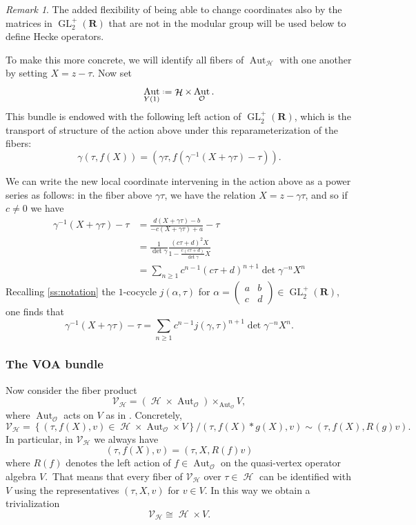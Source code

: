 \documentclass[12pt]{amsart}
\theoremstyle{plain}
\theoremstyle{definition}
\theoremstyle{remark}
\newtheorem{rmk}[thm]{Remark}
\newcommand{\cO}{\mathcal{O}}
\newcommand{\cV}{\mathcal{V}}
\DeclareMathOperator{\uhp}{\mathcal{H}}
\DeclareMathOperator{\Aut}{Aut}
\DeclareMathOperator{\GL}{GL}
\newcommand*{\df}{\mathrel{\vcenter{\baselineskip0.5ex \lineskiplimit0pt
                     \hbox{\scriptsize.}\hbox{\scriptsize.}}} =}
\providecommand{\stwomat}[4]{\left(\begin{smallmatrix}#1&#2\\#3&#4\end{smallmatrix}\right)}
\newcommand{\RR}{\mathbf{R}}
\begin{document}
\begin{rmk}
    The added flexibility of being able to change coordinates also by the matrices in $\GL_2^+(\RR)$ that are not in the modular group will be used below to define Hecke operators. 
\end{rmk}

To make this more concrete, we will identify all fibers of $\Aut_{\uhp}$ with one another by setting $X = z-\tau$. Now set
\[
\Aut_{Y(1)} \df \uhp \times \Aut_\cO.
\]
This bundle is endowed with the following left action of $\GL_2^+(\RR)$, which is the transport of structure of the action above under this reparameterization of the fibers:
\[
\gamma (\tau,f(X)) = (\gamma \tau, f(\gamma^{-1}(X+\gamma\tau)-\tau)).
\]

We can write the new local coordinate intervening in the action above as a power series as follows: in the fiber above $\gamma \tau$, we have the relation $X = z-\gamma \tau$, and so if $c\neq 0$ we have
\begin{align*}
\gamma^{-1}(X+\gamma \tau)-\tau &= \frac{d(X+\gamma \tau)-b}{-c(X+\gamma\tau)+a}-\tau\\
&=\frac{1}{\det\gamma}\frac{(c\tau+d)^2X}{1-\frac{c(c\tau+d)}{\det\gamma}X}\\
&=\sum_{n\geq 1} c^{n-1}(c\tau+d)^{n+1}\det\gamma^{-n}X^n
\end{align*}
Recalling \ref{ss:notation} the $1$-cocycle $j(\alpha,\tau)$ for $\alpha = \stwomat abcd \in \GL_2^+(\RR)$, one finds that
\begin{equation}
\label{eq:coordinateaction}
\gamma^{-1}(X+\gamma \tau)-\tau =\sum_{n\geq 1} c^{n-1}j(\gamma,\tau)^{n+1}\det\gamma^{-n}X^n.
\end{equation}


\subsubsection{The VOA bundle}
Now consider the fiber product 
\[\cV_{\uhp} = (\uhp \times \Aut_\cO)\times_{\Aut_\cO} V,\] 
where $\Aut_{\cO}$ acts on $V$ as in \cite{FBZ}. Concretely,
\[
\cV_{\uhp} = \left\{(\tau,f(X),v) \in \uhp\times \Aut_{\cO}\times V\right\}/(\tau,f(X)*g(X),v) \sim (\tau,f(X),R(g)v).
\]
In particular, in $\cV_{\uhp}$ we always have 
\[(\tau,f(X),v) = (\tau,X,R(f)v)\]
where $R(f)$ denotes the left action of $f\in \Aut_{\cO}$ on the quasi-vertex operator algebra $V$.\ That means that every fiber of $\cV_{\uhp}$ over $\tau \in \uhp$ can be identified with $V$ using the representatives $(\tau,X,v)$ for $v \in V$. In this way we obtain a trivialization
\[
\cV_{\uhp} \cong \uhp \times V.
\]
\end{document}
